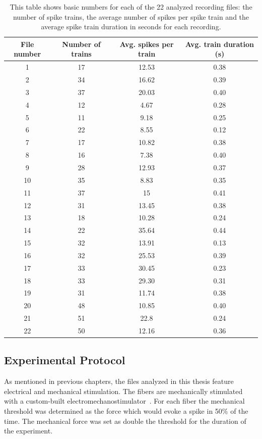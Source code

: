 \begin{table}[!ht]
\centering
\begin{tabular}{ |c|c|c|c| }
	\hline
	File number & Number of trains  & Avg. spikes per train & Avg. train duration (s)\\
	\hline
	1 & 17 & 12.53 & 0.38 \\
	2 & 34 & 16.62 & 0.39 \\
	3 & 37 & 20.03 & 0.40 \\
	4 & 12 & 4.67 & 0.28 \\
	5 & 11 & 9.18 & 0.25 \\
	6 & 22 & 8.55 & 0.12 \\
	7 & 17 & 10.82 & 0.38 \\
	8 & 16 & 7.38 & 0.40 \\
	9 & 28 & 12.93 & 0.37 \\
	10 & 35 & 8.83 & 0.35 \\
	11 & 37 & 15 & 0.41 \\
	12 & 31 & 13.45 & 0.38 \\
	13 & 18 & 10.28 & 0.24 \\
	14 & 22 & 35.64 & 0.44 \\
	15 & 32 & 13.91 & 0.13 \\
	16 & 32 & 25.53 & 0.39 \\
	17 & 33 & 30.45 & 0.23 \\
	18 & 33 & 29.30 & 0.31 \\
	19 & 31 & 11.74 & 0.38 \\
	20 & 48 & 10.85 & 0.40 \\
	21 & 51 & 22.8 & 0.24 \\
	22 & 50 & 12.16 & 0.36\\
	\hline
\end{tabular}
\caption{This table shows basic numbers for each of the 22 analyzed recording files: the number of spike trains, the average number of spikes per spike train and the average spike train duration in seconds for each recording.}
\label{table:recording_overview}
\end{table}

\subsection{Experimental Protocol}
As mentioned in previous chapters, the files analyzed in this thesis feature electrical and mechanical stimulation. The fibers are mechanically stimulated with a custom-built electromechanostimulator~\cite{roberto}. For each fiber the mechanical threshold was determined as the force which would evoke a spike in 50\% of the time. The mechanical force was set as double the threshold for the duration of the experiment.

